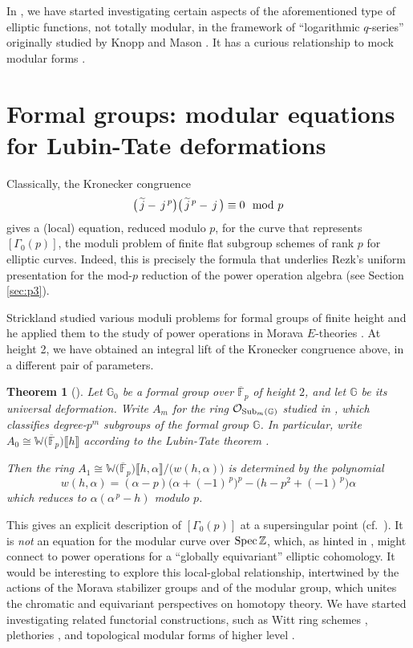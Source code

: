 \documentclass{rs}
\newtheorem{thm}[equation]{Theorem}
\theoremstyle{definition}
\theoremstyle{remark}
\newcommand{\mb}[1]{\mathbb{#1}}
\newcommand{\Spec}{{\rm Spec\thinspace}}
\newcommand{\cF}{\overline {\mb F}}
\newcommand{\CO}{{\cal O}}
\newcommand{\Sub}{{\rm Sub}}
\newcommand{\BG}{{\mb G}}
\newcommand{\BW}{{\mb W}}
\newcommand{\BZ}{{\mb Z}}
\newcommand{\tj}{\widetilde{j}}
\newcommand{\md}{~~{\rm mod}~}
\newcommand{\A}{\alpha}
\newcommand{\G}{\Gamma}
\newcommand{\lb}{\llbracket}
\newcommand{\rb}{\rrbracket}
\renewcommand{\=}{\approx}
\renewcommand{\-}{\sim}
\numberwithin{equation}{section}
\begin{document}
In \cite[Section 5]{ho}, we have started investigating certain aspects of the 
aforementioned type of elliptic functions, not totally modular, in the framework 
of ``logarithmic $q$-series'' originally studied by Knopp and Mason 
\cite{KnoppMason}.  It has a curious relationship to mock modular forms 
\cite[Remark 5.2]{ho}.  



\section{Formal groups: modular equations for Lubin-Tate deformations}

Classically, the Kronecker congruence 
\[
 \big(\,\tj - \,j^{\,p}\big) \,\! \big(\,\tj^{\,p} - \,j\,\big) \equiv 0 \md p 
\]
gives a (local) equation, reduced modulo $p$, for the curve that represents 
$[\G_0(p)]$, the moduli problem of finite flat subgroup schemes of rank $p$ for 
elliptic curves.  Indeed, this is precisely the formula that underlies Rezk's 
uniform presentation for the mod-$p$ reduction of the power operation algebra 
(see Section \ref{sec:p3}).  

Strickland studied various moduli problems for formal groups of finite height 
\cite{Str97} and he applied them to the study of power operations in Morava 
$E$-theories \cite{Str98}.  At height 2, we have obtained an integral lift of 
the Kronecker congruence above, in a different pair of parameters.  

\begin{thm}[{\cite[Theorem 1.2]{me}}]
 \label{thm:me}
 Let $\BG_0$ be a formal group over $\cF_p$ of height $2$, and let $\BG$ be its 
 universal deformation.  Write $A_m$ for the ring $\CO_{\Sub_m(\BG)}$ studied in 
 \cite{Str97}, which classifies degree-$p^m$ subgroups of the formal group 
 $\BG$.  In particular, write $A_0 \cong \BW\big(\cF_p\big)\lb h \rb$ according 
 to the Lubin-Tate theorem \cite{LubinTate}.  

 Then the ring $A_1 \cong \BW\big(\cF_p\big)\lb h, \A \rb / \big(w(h,\A)\big)$ 
 is determined by the polynomial 
 \begin{equation}
  \label{w}
  w(h,\A) = (\A - p) \big(\A + (-1)^{\,p}\big)^p 
          - \big(h - p^2 + (-1)^{\,p}\big) \A 
 \end{equation}
 which reduces to $\A (\A^{\,p} - h)$ modulo $p$.  
\end{thm}

This gives an explicit description of $[\G_0(p)]$ at a supersingular point 
(cf.~\cite[Section 7.7]{KM}).  It is {\em not} an equation for the modular curve 
over $\Spec \BZ$, which, as hinted in \cite{RezkMSRI}, might connect to power 
operations for a ``globally equivariant'' elliptic cohomology.  It would be 
interesting to explore this local-global relationship, intertwined by the 
actions of the Morava stabilizer groups and of the modular group, which unites 
the chromatic and equivariant perspectives on homotopy theory.  We have started 
investigating related functorial constructions, such as Witt ring schemes 
\cite{FG}, plethories \cite{BorgerWieland}, and topological modular forms of 
higher level \cite{logetaletmf}.  
\end{document}
